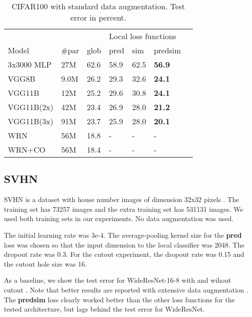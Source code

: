 \documentclass{article}
\begin{document}
\begin{table}[h]
  \caption{CIFAR100 with standard data augmentation. Test error in percent.}
  \label{table:cifar100}
  \centering
  \begin{tabular}{lllllll}
    \toprule    
    &&& \multicolumn{3}{|l}{Local loss functions} \\
    Model   & \#par & glob & \multicolumn{1}{|l}{pred} & sim & \multicolumn{1}{l}{predsim}  \\
    \midrule
    3x3000 MLP & 27M &  62.6 & \multicolumn{1}{|l}{58.9} & 62.5  & \textbf{56.9} \\
    VGG8B      & 9.0M &  26.2 & \multicolumn{1}{|l}{29.3} & 32.6 & \textbf{24.1} \\
    VGG11B     & 12M &  25.2 & \multicolumn{1}{|l}{29.6} & 30.8  & \textbf{24.1} \\
    VGG11B(2x) & 42M &  23.4 & \multicolumn{1}{|l}{26.9} & 28.0  & \textbf{21.2} \\
    VGG11B(3x) & 91M & 23.7 & \multicolumn{1}{|l}{25.9} & 28.0 & \textbf{20.1} \\
    \midrule
    WRN        & 56M & 18.8  & \multicolumn{1}{|l}{-} & - & - \\
    WRN+CO     & 56M & 18.4  & \multicolumn{1}{|l}{-} & - & - \\
    \bottomrule
  \end{tabular}
\end{table}

\subsection{SVHN}

SVHN is a dataset with house number images of dimension 32x32 pixels \cite{Netzer2011}. The training set has 73257 images and the extra training set has 531131 images. We used both training sets in our experiments. No data augmentation was used. 

The initial learning rate was 3e-4. The average-pooling kernel size for the \textbf{pred} loss was chosen so that the input dimension to the local classifier was 2048. The dropout rate was 0.3. For the cutout experiment, the dropout rate was 0.15 and the cutout hole size was 16.

As a baseline, we show the test error for WideResNet-16-8 with and wihout cutout \cite{DevriesT17}. Note that better results are reported with extensive data augmentation \cite{CubukZMVL18}. The \textbf{predsim} loss clearly worked better than the other loss functions for the tested architecture, but lags behind the test error for WideResNet. 
\end{document}
